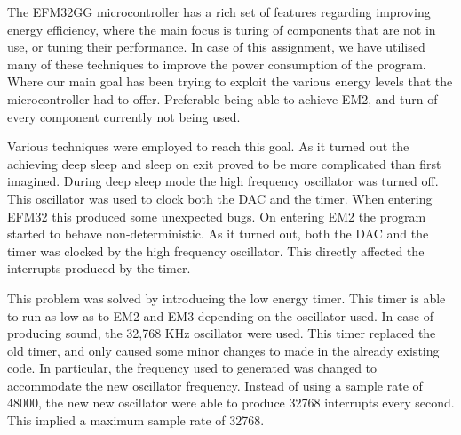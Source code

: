 The EFM32GG microcontroller has a rich set of features regarding improving energy efficiency, where the main focus is turing of components that are not in use, or tuning their performance. In case of this assignment, we have utilised many of these techniques to improve the power consumption of the program. Where our main goal has been trying to exploit the various energy levels that the microcontroller had to offer. Preferable being able to achieve EM2, and turn of every component currently not being used. 

Various techniques were employed to reach this goal. As it turned out the achieving deep sleep and sleep on exit proved to be more complicated than first imagined. During deep sleep mode the high frequency oscillator was turned off. This oscillator was used to clock both the DAC and the timer. When entering EFM32 this produced some unexpected bugs. On entering EM2 the program started to behave non-deterministic. As it turned out, both the DAC and the timer was clocked by the high frequency oscillator. This directly affected the interrupts produced by the timer.

This problem was solved by introducing the low energy timer. This timer is able to run as low as to EM2 and EM3 depending on the oscillator used. In case of producing sound, the 32,768 KHz oscillator were used. This timer replaced the old timer, and only caused some minor changes to made in the already existing code. In particular, the frequency used to generated was changed to accommodate the new oscillator frequency. Instead of  using a sample rate of 48000, the new 
new oscillator were able to produce 32768 interrupts every second. This implied a maximum sample rate of 32768.



